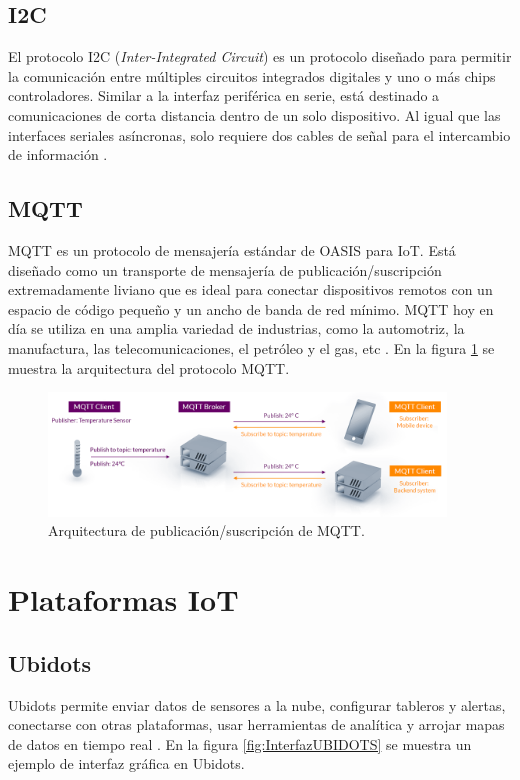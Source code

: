 \subsection{I2C}

El protocolo I2C (\textit {Inter-Integrated Circuit}) es un protocolo diseñado para permitir la comunicación entre múltiples circuitos integrados digitales y uno o más chips controladores. Similar a la interfaz periférica en serie, está destinado a comunicaciones de corta distancia dentro de un solo dispositivo. Al igual que las interfaces seriales asíncronas, solo requiere dos cables de señal para el intercambio de información \citep{I2C}.

\subsection{MQTT}
MQTT es un protocolo de mensajería estándar de OASIS para IoT. Está diseñado como un transporte de mensajería de publicación/suscripción extremadamente liviano que es ideal para conectar dispositivos remotos con un espacio de código pequeño y un ancho de banda de red mínimo. MQTT hoy en día se utiliza en una amplia variedad de industrias, como la automotriz, la manufactura, las telecomunicaciones, el petróleo y el gas, etc \citep{MQTT}. En la figura \ref{fig:ArquitecturaMQTT} se muestra la arquitectura del protocolo MQTT.
\begin{figure}[htbp]
	\centering
	\includegraphics[width=\textwidth, height=3.3cm]{./Figures/mqtt-publish-subscribe.png}
	\caption{Arquitectura de publicación/suscripción de MQTT\protect\footnotemark.}
	\label{fig:ArquitecturaMQTT}
\end{figure}

\section{Plataformas IoT}
\subsection{Ubidots}
Ubidots permite enviar datos de sensores a la nube, configurar tableros y alertas, conectarse con otras plataformas, usar herramientas de analítica y arrojar mapas de datos en tiempo real \citep{InterfazIoTUbidots}. En la figura \ref{fig:InterfazUBIDOTS} se muestra un ejemplo de interfaz gráfica en Ubidots.

